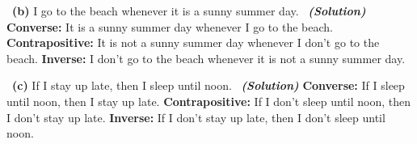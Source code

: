 \documentclass[a4 paper]{article}
\numberwithin{equation}{section}
\newcommand{\subproblem}[1]{~\newline\textbf{(#1)}}
\newcommand{\solution}{~\newline\textbf{\textit{(Solution)}} }
\newcommand{\0}{\mathbf{0}}
\begin{document}
\subproblem{b} I go to the beach whenever it is a sunny summer day.
\solution
\newline
\newline
\textbf{Converse:}
It is a sunny summer day whenever I go to the beach.
\newline
\newline
\textbf{Contrapositive:}
It is not a sunny summer day whenever I don't go to the beach.
\newline
\newline
\textbf{Inverse:}
I don't go to the beach whenever it is not a sunny summer day.
\newline
\newline
\newline
\newline
\newline


\subproblem{c} If I stay up late, then I sleep until
noon.
\solution
\newline
\newline
\textbf{Converse:}
If I sleep until noon, then I stay up late.
\newline
\newline
\textbf{Contrapositive:}
If I don't sleep until noon, then I don't stay up late.
\newline
\newline
\textbf{Inverse:}
If I don't stay up late, then I don't sleep until noon.
\newline
\newline
\end{document}
